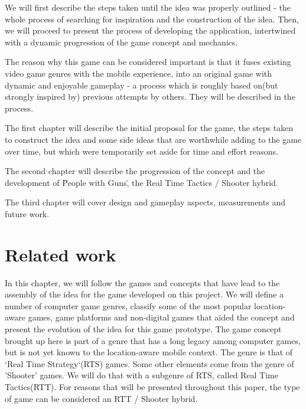 \documentclass{article}
\begin{document}
We will first describe the steps taken until the idea was properly outlined -
the whole process of searching for inspiration and the construction of the idea.
Then, we will proceed to present the process of developing the application,
intertwined with a dynamic progression of the game concept and
mechanics.\newline

The reason why this game can be considered important is that it fuses existing
video game genres with the mobile experience, into an original game with dynamic
and enjoyable gameplay - a process which is roughly based on(but strongly
inspired by) previous attempts by others. They will be described in the
process.\newline

The first chapter will describe the initial proposal for the game, the steps
taken to construct the idea and some side ideas that are worthwhile adding to
the game over time, but which were temporarily set aside for time and effort
reasons.\newline

The second chapter will describe the progression of the concept and the
development of \"People with Guns\", the Real Time Tactics / Shooter
hybrid.\newline

The third chapter will cover design and gameplay aspects, measurements and
future work.\newline

\section{Related work}

In this chapter, we will follow the games and concepts that have lead to the
assembly of the idea for the game developed on this project. We will define a
number of computer game genres, classify some of the most popular location-aware
games, game platforms and non-digital games that aided the concept and present
the evolution of the idea for this game prototype. The game concept brought up
here is part of a genre that has a long legacy among computer games, but is not
yet known to the location-aware mobile context. The genre is that of `Real
Time Strategy`(RTS)\cite{rts} games. Some other elements come from the genre of
'Shooter' games\cite{shooter}. We will do that with a subgenre of RTS, called
Real Time Tactics(RTT)\cite{rttvsrts}. For reasons that will be presented
throughout this paper, the type of game can be considered an RTT / Shooter
hybrid. \newline
\end{document}
